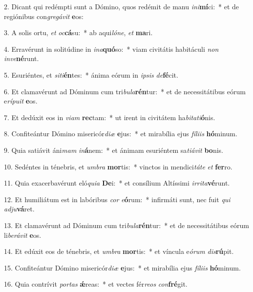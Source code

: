 2. Dicant qui redémpti sunt a Dómino, quos redémit de manu \textit{in}\textit{i}\textbf{mí}ci:~*  et de regiónibus con\textit{gre}\textit{gá}\textit{vit} \textbf{e}os:\

3. A solis ortu, \textit{et} \textit{oc}\textbf{cá}su:~*  ab aqui\textit{ló}\textit{ne}, \textit{et} \textbf{ma}ri.\

4. Erravérunt in solitúdine in \textit{in}\textit{a}\textbf{quó}so:~*  viam civitátis habitáculi \textit{non} \textit{in}\textit{ve}\textbf{né}runt.\

5. Esuriéntes, et \textit{si}\textit{ti}\textbf{én}tes:~*  ánima eórum in \textit{ip}\textit{sis} \textit{de}\textbf{fé}cit.\

6. Et clamavérunt ad Dóminum cum tri\textit{bu}\textit{la}\textbf{rén}tur:~*  et de necessitátibus eórum e\textit{rí}\textit{pu}\textit{it} \textbf{e}os.\

7. Et dedúxit eos in \textit{vi}\textit{am} \textbf{rec}tam:~*  ut irent in civitátem ha\textit{bi}\textit{ta}\textit{ti}\textbf{ó}nis.\

8. Confiteántur Dómino misericór\textit{di}\textit{æ} \textbf{e}jus:~*  et mirabília ejus \textit{fí}\textit{li}\textit{is} \textbf{hó}minum.\

9. Quia satiávit áni\textit{mam} \textit{in}\textbf{á}nem:~*  et ánimam esuriéntem sa\textit{ti}\textit{á}\textit{vit} \textbf{bo}nis.\

10. Sedéntes in ténebris, et \textit{um}\textit{bra} \textbf{mor}tis:~*  vinctos in mendici\textit{tá}\textit{te} \textit{et} \textbf{fer}ro.\

11. Quia exacerbavérunt eló\textit{qui}\textit{a} \textbf{De}i:~*  et consílium Altíssimi \textit{ir}\textit{ri}\textit{ta}\textbf{vé}runt.\

12. Et humiliátum est in labóribus \textit{cor} \textit{e}\textbf{ó}rum:~*  infirmáti sunt, nec fuit \textit{qui} \textit{ad}\textit{ju}\textbf{vá}ret.\

13. Et clamavérunt ad Dóminum cum tri\textit{bu}\textit{la}\textbf{rén}tur:~*  et de necessitátibus eórum li\textit{be}\textit{rá}\textit{vit} \textbf{e}os.\

14. Et edúxit eos de ténebris, et \textit{um}\textit{bra} \textbf{mor}tis:~*  et víncula e\textit{ó}\textit{rum} \textit{dis}\textbf{rú}pit.\

15. Confiteántur Dómino misericór\textit{di}\textit{æ} \textbf{e}jus:~*  et mirabília ejus \textit{fí}\textit{li}\textit{is} \textbf{hó}minum.\

16. Quia contrívit \textit{por}\textit{tas} \textbf{ǽ}reas:~*  et vectes fér\textit{re}\textit{os} \textit{con}\textbf{fré}git.\

